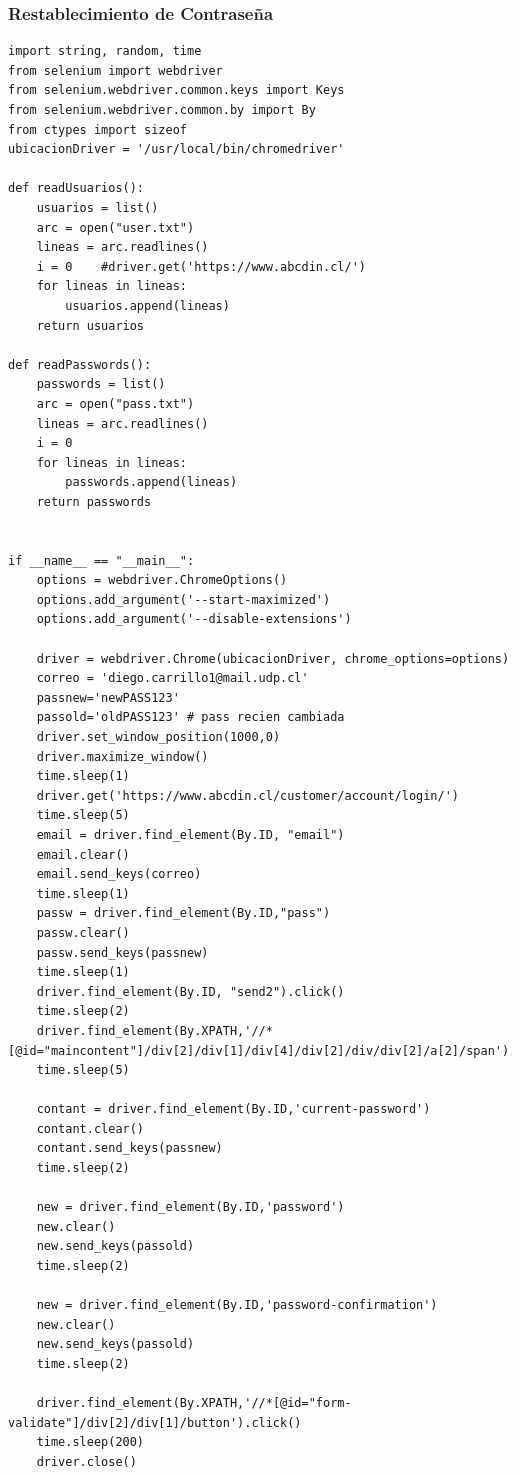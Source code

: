 \documentclass[]{article}
\begin{document}
\subsubsection{Restablecimiento de Contraseña}      
    \begin{lstlisting}[lenguaje=py]
import string, random, time
from selenium import webdriver
from selenium.webdriver.common.keys import Keys
from selenium.webdriver.common.by import By
from ctypes import sizeof
ubicacionDriver = '/usr/local/bin/chromedriver'

def readUsuarios():
    usuarios = list()
    arc = open("user.txt")
    lineas = arc.readlines()
    i = 0    #driver.get('https://www.abcdin.cl/')
    for lineas in lineas:
        usuarios.append(lineas)
    return usuarios

def readPasswords():
    passwords = list()
    arc = open("pass.txt")
    lineas = arc.readlines()
    i = 0
    for lineas in lineas:
        passwords.append(lineas)
    return passwords


if __name__ == "__main__":
    options = webdriver.ChromeOptions()
    options.add_argument('--start-maximized')
    options.add_argument('--disable-extensions')

    driver = webdriver.Chrome(ubicacionDriver, chrome_options=options)
    correo = 'diego.carrillo1@mail.udp.cl'
    passnew='newPASS123'
    passold='oldPASS123' # pass recien cambiada
    driver.set_window_position(1000,0)
    driver.maximize_window()
    time.sleep(1)
    driver.get('https://www.abcdin.cl/customer/account/login/')
    time.sleep(5)
    email = driver.find_element(By.ID, "email")
    email.clear()
    email.send_keys(correo)
    time.sleep(1)
    passw = driver.find_element(By.ID,"pass")
    passw.clear()
    passw.send_keys(passnew)
    time.sleep(1)
    driver.find_element(By.ID, "send2").click()
    time.sleep(2)
    driver.find_element(By.XPATH,'//*[@id="maincontent"]/div[2]/div[1]/div[4]/div[2]/div/div[2]/a[2]/span').click()
    time.sleep(5)
    
    contant = driver.find_element(By.ID,'current-password')
    contant.clear()
    contant.send_keys(passnew)
    time.sleep(2)

    new = driver.find_element(By.ID,'password')
    new.clear()
    new.send_keys(passold)
    time.sleep(2)

    new = driver.find_element(By.ID,'password-confirmation')
    new.clear()
    new.send_keys(passold)
    time.sleep(2)

    driver.find_element(By.XPATH,'//*[@id="form-validate"]/div[2]/div[1]/button').click()
    time.sleep(200)
    driver.close()
    \end{lstlisting}
\end{document}

